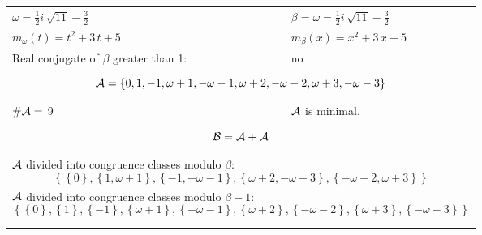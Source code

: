 \begin{exmp}
\label{ex:compareAN}


\rule{0cm}{0cm}

\begin{tabular}{ll}
$\omega=  \frac{1}{2} i \, \sqrt{11} - \frac{3}{2} $  & $\beta= \omega = \frac{1}{2} i \, \sqrt{11} - \frac{3}{2} $\\
$m_\omega(t)=  t^{2} + 3 \, t + 5 $  & $m_\beta(x)=  x^{2} + 3 \, x + 5 $\\
Real conjugate of $\beta$ greater than 1:   &  no \\ \hline
\multicolumn{2}{l}{\begin{minipage}{\textwidth}\begin{dmath*}\A = \left\{0, 1, -1, \omega + 1, -\omega - 1, \omega + 2, -\omega - 2, \omega + 3, -\omega - 3\right\}  \end{dmath*}\end{minipage} }\\
$\#\mathcal{A}= $ 9 $ $ & $\mathcal{A}$ is minimal. \\
\multicolumn{2}{l}{\begin{minipage}{\textwidth}\begin{dmath*}\B =\A+\A \end{dmath*}\end{minipage} }\\[10pt]
\multicolumn{2}{l}{\begin{minipage}{\textwidth}$\mathcal{A}$ divided into congruence classes modulo $\beta$: \begin{dmath*} \left\{\left\{0\right\}, \left\{1, \omega + 1\right\}, \left\{-1, -\omega - 1\right\}, \left\{\omega + 2, -\omega - 3\right\}, \left\{-\omega - 2, \omega + 3\right\}\right\}  \end{dmath*}\end{minipage} }\\[10pt]
\multicolumn{2}{l}{\begin{minipage}{\textwidth}$\mathcal{A}$ divided into congruence classes modulo $\beta-1$: \begin{dmath*} \left\{\left\{0\right\}, \left\{1\right\}, \left\{-1\right\}, \left\{\omega + 1\right\}, \left\{-\omega - 1\right\}, \left\{\omega + 2\right\}, \left\{-\omega - 2\right\}, \left\{\omega + 3\right\}, \left\{-\omega - 3\right\}\right\}  \end{dmath*}\end{minipage} }\\
 & \\ \hline
 & \\
\end{tabular}


\end{exmp}
